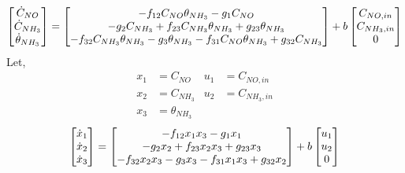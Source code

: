\begin{equation*}
     \begin{bmatrix} \dot C_{NO} \\
        \dot C_{NH_3}\\
        \dot \theta_{NH_3}\\
         \end{bmatrix} =
    \begin{bmatrix} 
        -f_{12} C_{NO} \theta_{NH_3}
        -g_1 C_{NO}
        \\
        -g_2 C_{NH_3}
        + f_{23} C_{NH_3} \theta_{NH_3}
        + g_{23} \theta_{NH_3}
        \\
        -f_{32} C_{NH_3} \theta_{NH_3}
        -g_3 \theta_{NH_3}
        -f_{31} C_{NO} \theta_{NH_3}
        + g_{32} C_{NH_3}
     \end{bmatrix}
    + b \begin{bmatrix} C_{NO, in} \\ C_{NH_3, in} \\ 0 \end{bmatrix}
\end{equation*}
Let,
\begin{align*}
    x_1 &= C_{NO} &  u_1 &= C_{NO, in}\\
    x_2 &= C_{NH_3} & u_2 &= C_{NH_3, in}\\
    x_3 &= \theta_{NH_3} & &
\end{align*}
\begin{equation}\label{eqn::parm_model}
     \begin{bmatrix} \dot x_1 \\
        \dot x_2\\
        \dot x_3\\
         \end{bmatrix} =
    \begin{bmatrix} 
        -f_{12} x_1 x_3
        -g_1 x_1
        \\
        -g_2 x_2
        + f_{23} x_2 x_3
        + g_{23} x_3
        \\
        -f_{32} x_2 x_3
        -g_3 x_3
        -f_{31} x_1 x_3
        + g_{32} x_2
     \end{bmatrix}
    + b \begin{bmatrix} u_1 \\ u_2 \\ 0 \end{bmatrix}
\end{equation}


